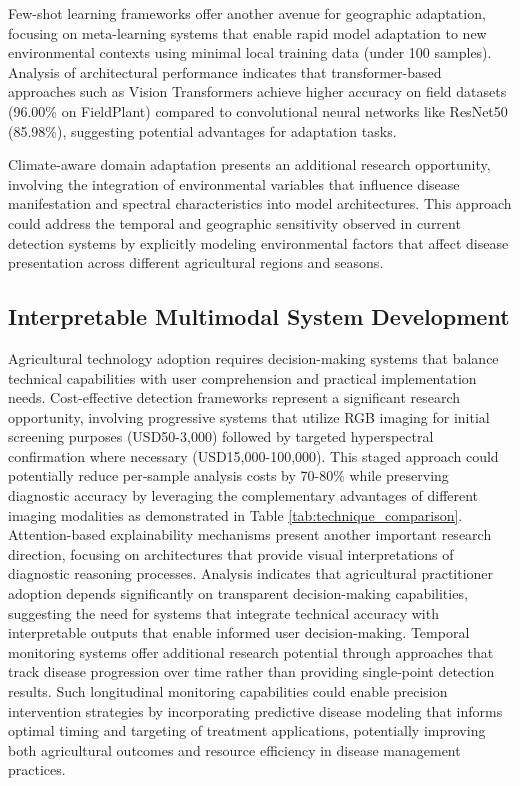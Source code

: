 \documentclass[sn-mathphys]{sn-jnl}
\theoremstyle{thmstyleone}%
\theoremstyle{thmstyletwo}%
\theoremstyle{thmstylethree}%
\begin{document}
Few-shot learning frameworks offer another avenue for geographic adaptation, focusing on meta-learning systems that enable rapid model adaptation to new environmental contexts using minimal local training data (under 100 samples). Analysis of architectural performance indicates that transformer-based approaches such as Vision Transformers achieve higher accuracy on field datasets (96.00\% on FieldPlant) compared to convolutional neural networks like ResNet50 (85.98\%), suggesting potential advantages for adaptation tasks. 

Climate-aware domain adaptation presents an additional research opportunity, involving the integration of environmental variables that influence disease manifestation and spectral characteristics into model architectures. This approach could address the temporal and geographic sensitivity observed in current detection systems by explicitly modeling environmental factors that affect disease presentation across different agricultural regions and seasons.

\subsection{Interpretable Multimodal System Development}
Agricultural technology adoption requires decision-making systems that balance technical capabilities with user comprehension and practical implementation needs. Cost-effective detection frameworks represent a significant research opportunity, involving progressive systems that utilize RGB imaging for initial screening purposes (USD50-3,000) followed by targeted hyperspectral confirmation where necessary (USD15,000-100,000). This staged approach could potentially reduce per-sample analysis costs by 70-80\% while preserving diagnostic accuracy by leveraging the complementary advantages of different imaging modalities as demonstrated in Table \ref{tab:technique_comparison}. Attention-based explainability mechanisms present another important research direction, focusing on architectures that provide visual interpretations of diagnostic reasoning processes. Analysis indicates that agricultural practitioner adoption depends significantly on transparent decision-making capabilities, suggesting the need for systems that integrate technical accuracy with interpretable outputs that enable informed user decision-making. Temporal monitoring systems offer additional research potential through approaches that track disease progression over time rather than providing single-point detection results. Such longitudinal monitoring capabilities could enable precision intervention strategies by incorporating predictive disease modeling that informs optimal timing and targeting of treatment applications, potentially improving both agricultural outcomes and resource efficiency in disease management practices.
\end{document}
